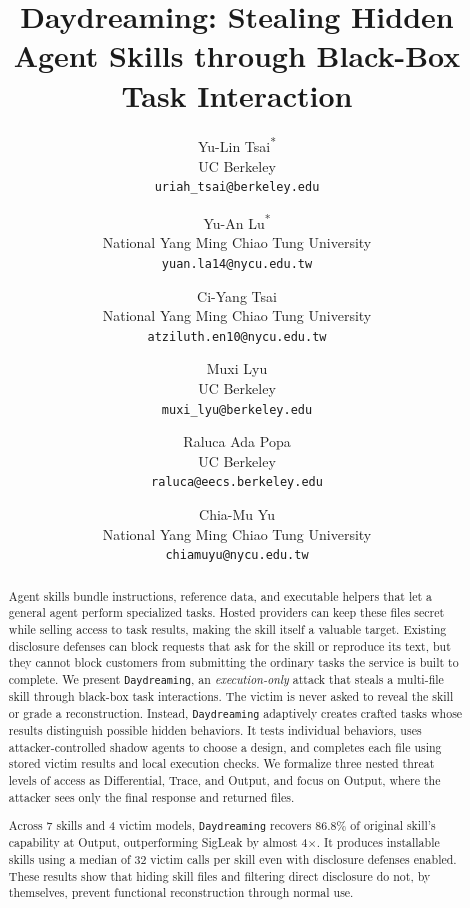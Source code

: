 \documentclass[letterpaper,twocolumn,10pt]{article}
\newcommand{\method}{\texttt{Daydreaming}\xspace}
\begin{document}
\date{}

\title{\Large Daydreaming: Stealing Hidden Agent Skills through Black-Box Task Interaction}

\author{
{\rm Yu-Lin Tsai\textsuperscript{*}}\\
UC Berkeley\\
\texttt{uriah\_tsai@berkeley.edu}
\and
{\rm Yu-An Lu\textsuperscript{*}}\\
National Yang Ming Chiao Tung University\\
\texttt{yuan.la14@nycu.edu.tw}
\and
{\rm Ci-Yang Tsai}\\
National Yang Ming Chiao Tung University\\
\texttt{atziluth.en10@nycu.edu.tw}
\and
{\rm Muxi Lyu}\\
UC Berkeley\\
\texttt{muxi\_lyu@berkeley.edu}
\and
{\rm Raluca Ada Popa}\\
UC Berkeley\\
\texttt{raluca@eecs.berkeley.edu}
\and
{\rm Chia-Mu Yu}\\
National Yang Ming Chiao Tung University\\
\texttt{chiamuyu@nycu.edu.tw}
}

\maketitle
\begingroup
\renewcommand{\thefootnote}{}
\addtocounter{footnote}{-1}
\endgroup

\begin{abstract}
Agent skills bundle instructions, reference data, and executable helpers that let a general agent perform specialized tasks.  Hosted providers can keep these files secret while selling access to task results, making the skill itself a valuable target.  Existing disclosure defenses can block requests that ask for
the skill or reproduce its text, but they cannot block customers from submitting the ordinary tasks the service is built to complete. We present \method, an \textit{execution-only} attack that steals a multi-file skill through black-box task interactions. The victim is never asked to reveal the skill or grade a reconstruction. Instead,
\method adaptively creates crafted tasks whose results distinguish possible hidden behaviors.  It tests individual behaviors, uses attacker-controlled shadow agents to choose a design, and completes each file using stored victim results and local execution checks.  We formalize three nested threat levels of access as 
Differential, Trace, and Output, and focus on Output, where the attacker
sees only the final response and returned files.

Across 7 skills and 4 victim models,
\method recovers $86.8\%$ of original skill's capability at Output, outperforming SigLeak by almost 4$\times$.  It produces installable skills using a median of 32 victim calls per skill even with disclosure defenses enabled. These results show that hiding skill files and filtering direct disclosure do not, by themselves, prevent functional reconstruction through normal use.
\end{abstract}
\end{document}
